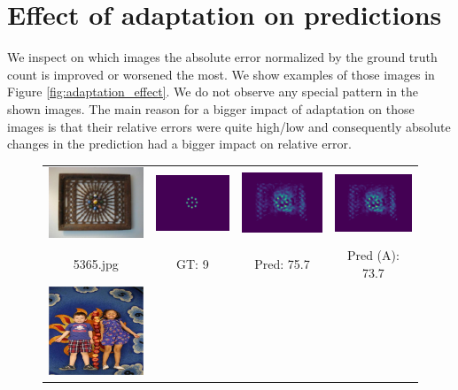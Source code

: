 \section{Effect of adaptation on predictions}
\label{app:adapt}

We inspect on which images the absolute error normalized by the ground truth count is improved or worsened the most. We show examples of those images in Figure \ref{fig:adaptation_effect}. We do not observe any special pattern in the shown images. The main reason for a bigger impact of adaptation on those images is that their relative errors were quite high/low and consequently absolute changes in the prediction had a bigger impact on relative error.

\begin{figure}[htb]
	\centering
	\begin{tabular}{cccc}
		\includegraphics[width=0.24\linewidth]{fig/5365_img.png} &
		\includegraphics[width=0.24\linewidth]{fig/5365_gt.png} &
		\includegraphics[width=0.24\linewidth]{fig/5365_predict.png} &
		\includegraphics[width=0.24\linewidth]{fig/5365_adapt.png} \\
		5365.jpg & GT: 9 & Pred: 75.7 & Pred (A): 73.7 \\
		\includegraphics[width=0.24\linewidth]{fig/6266_img.jpg} &

\end{tabular}
\end{figure}
